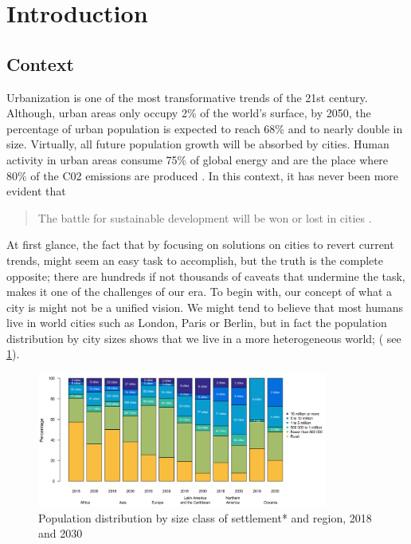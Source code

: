 \section{Introduction}
\subsection{Context}
Urbanization is one of the most transformative trends of the 21st century. Although, urban areas only occupy 2\% of the world’s surface, by 2050, the percentage of urban population is expected to reach 68\% and to nearly double in size. Virtually, all future population growth will be absorbed by cities. Human activity in urban areas consume 75\% of global energy and are the place where 80\% of the C02 emissions are produced \cite{UN2018}. In this context, it has never been more evident that 
%
    \begin{quote} 
    The battle for sustainable development will be won or lost in cities \cite{UnitedNations}.
    \end{quote}\par
%
At first glance, the fact that by focusing on solutions on cities to revert current trends, might seem an easy task to accomplish, but the truth is the complete opposite; there are hundreds if not thousands of caveats that undermine the task, makes it one of the challenges of our era. To begin with, our concept of what a city is might not be a unified vision. We might tend to believe that most humans live in world cities such as London, Paris or Berlin, but in fact the population distribution by city sizes shows that we live in a more heterogeneous world; ( see \ref{fig:pop_dist}).\par

\begin{figure}[hbt!]
    \centering
    \includegraphics[width=0.85\textwidth]{Imgs/1_pop_dist.PNG}
    \caption{Population distribution by size class of settlement* and region, 2018 and 2030}
    \label{fig:pop_dist}
\end{figure}
 
